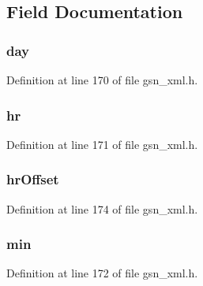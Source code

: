 \subsection{Field Documentation}
\hypertarget{a00432_a2121477f11d8a58cddd6a8c0e9717476}{
\subsubsection[{day}]{ {\bf day}}}
\label{a00432_a2121477f11d8a58cddd6a8c0e9717476}


Definition at line 170 of file gsn\_\-xml.h.

\hypertarget{a00432_a5dff479f0f1395e93a28dd0c7b1335b2}{
\subsubsection[{hr}]{ {\bf hr}}}
\label{a00432_a5dff479f0f1395e93a28dd0c7b1335b2}


Definition at line 171 of file gsn\_\-xml.h.

\hypertarget{a00432_aad11de9474bbeeed27b4986d738cf48e}{
\subsubsection[{hrOffset}]{ {\bf hrOffset}}}
\label{a00432_aad11de9474bbeeed27b4986d738cf48e}


Definition at line 174 of file gsn\_\-xml.h.

\hypertarget{a00432_afcd3b3e11f0b83ec71d50a827e42d9db}{
\subsubsection[{min}]{ {\bf min}}}
\label{a00432_afcd3b3e11f0b83ec71d50a827e42d9db}


Definition at line 172 of file gsn\_\-xml.h.

